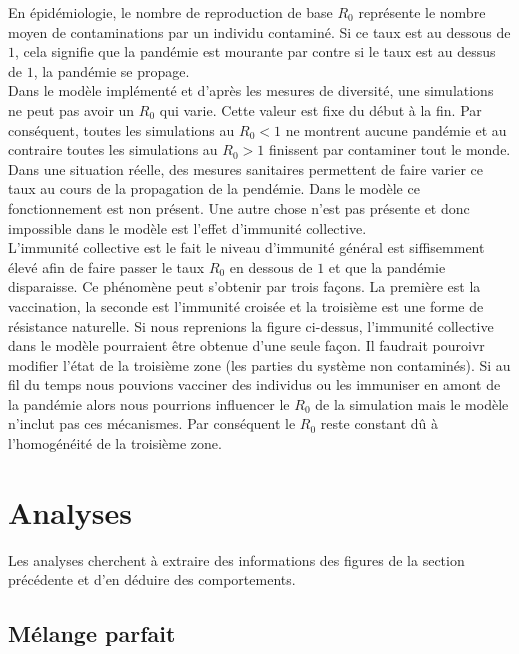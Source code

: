 En épidémiologie, le nombre de reproduction de base $R_0$ représente le nombre moyen de contaminations par un individu contaminé. Si ce taux est au dessous de $1$, cela signifie que la pandémie est mourante par contre si le taux est au dessus de $1$, la pandémie se propage.\\

Dans le modèle implémenté et d'après les mesures de diversité, une simulations ne peut pas avoir un $R_0$ qui varie. Cette valeur est fixe du début à la fin. Par conséquent, toutes les simulations au $R_0 < 1$ ne montrent aucune pandémie et au contraire toutes les simulations au $R_0 > 1$ finissent par contaminer tout le monde. Dans une situation réelle, des mesures sanitaires permettent de faire varier ce taux au cours de la propagation de la pendémie. Dans le modèle ce fonctionnement est non présent. Une autre chose n'est pas présente et donc impossible dans le modèle est l'effet d'immunité collective.\\

L'immunité collective est le fait le niveau d'immunité général est siffisemment élevé afin de faire passer le taux $R_0$ en dessous de $1$ et que la pandémie disparaisse. Ce phénomène peut s'obtenir par trois façons. La première est la vaccination, la seconde est l'immunité croisée et la troisième est une forme de résistance naturelle. Si nous reprenions la figure ci-dessus, l'immunité collective dans le modèle pourraient être obtenue d'une seule façon. Il faudrait pouroivr modifier l'état de la troisième zone (les parties du système non contaminés). Si au fil du temps nous pouvions vacciner des individus ou les immuniser en amont de la pandémie alors nous pourrions influencer le $R_0$ de la simulation mais le modèle n'inclut pas ces mécanismes. Par conséquent le $R_0$ reste constant dû à l'homogénéité de la troisième zone.

\section{Analyses}

Les analyses cherchent à extraire des informations des figures de la section précédente et d'en déduire des comportements.

\subsection{Mélange parfait}

